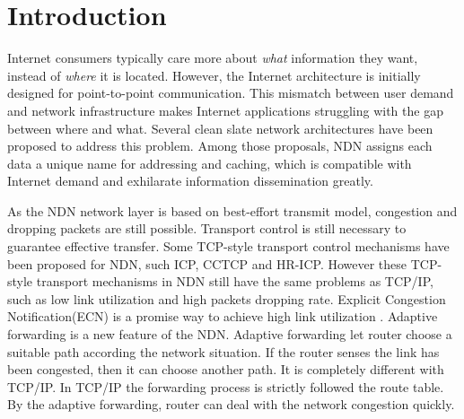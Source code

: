 
\section{Introduction}


Internet consumers typically care more about \emph{what} information they want, instead of \emph{where} it is located. However, the Internet architecture is initially designed for point-to-point communication. This mismatch between user demand and network infrastructure makes Internet applications struggling with the gap between where and what. Several clean slate network architectures have been proposed to address this problem. Among those proposals, NDN\cite{NDN} assigns each data a unique name for addressing and caching, which is compatible with Internet demand and exhilarate information dissemination greatly. 

As the NDN network layer is based on best-effort transmit model, congestion and dropping packets are still possible. Transport control is still necessary to guarantee effective transfer. Some TCP-style transport control mechanisms have been proposed for NDN, such ICP\cite{ICP}, CCTCP\cite{CCTCP} and HR-ICP\cite{shape}. However these TCP-style transport mechanisms in NDN still have the same problems as TCP/IP, such as low link utilization and high packets dropping rate. Explicit Congestion Notification(ECN) is a promise way to achieve high link utilization\cite{XCP} . Adaptive forwarding is a new feature of the NDN\cite{Adaptive}. Adaptive forwarding let router choose a suitable path according the network situation. If the router senses the link has been congested, then it can choose another path. It is completely different with TCP/IP. In TCP/IP the forwarding process is strictly followed the route table. By the adaptive forwarding, router can deal with the network congestion quickly.


